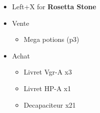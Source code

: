 \begin{shop}
	\begin{itemize}
		\item Left+X for \textbf{Rosetta Stone}
		\item Vente
			\begin{itemize}
				\item Mega potions (p3)
			\end{itemize}
		\item Achat
			\begin{itemize}
				\item Livret Vgr-A x3
				\item Livret HP-A x1
				\item Decapaciteur x21
			\end{itemize}
	\end{itemize}
\end{shop}

\vfill

